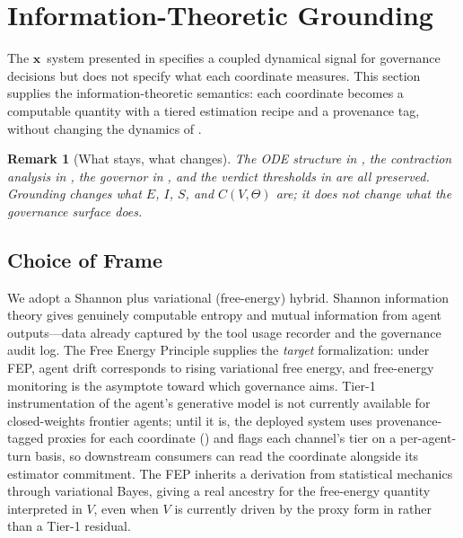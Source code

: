 \documentclass[11pt,twocolumn]{article}
\newtheorem{remark}[theorem]{Remark}
\newcommand{\eisv}{\ensuremath{\mathbf{x}}}
\newcommand{\cv}{\ensuremath{C(V,\Theta)}}
\begin{document}
\section{Information-Theoretic Grounding}
\label{sec:grounding}

The \eisv\ system presented in  specifies a
coupled dynamical signal for governance decisions but does not
specify what each coordinate measures. This section supplies the
information-theoretic semantics: each coordinate becomes a
computable quantity with a tiered estimation recipe and a
provenance tag, without changing the dynamics of
.

\begin{remark}[What stays, what changes]
The ODE structure in , the contraction
analysis in , the governor in
, and the verdict thresholds in  are
all preserved. Grounding changes what $E$, $I$, $S$, and
$\cv$ \emph{are}; it does not change what the governance surface
\emph{does}.
\end{remark}

\subsection{Choice of Frame}

We adopt a Shannon plus variational (free-energy) hybrid. Shannon
information theory gives genuinely computable entropy and mutual
information from agent outputs---data already captured by the tool
usage recorder and the governance audit log. The Free Energy Principle
\cite{friston2010free} supplies the \emph{target} formalization: under
FEP, agent drift corresponds to rising variational free energy, and
free-energy monitoring is the asymptote toward which governance aims.
Tier-1 instrumentation of the agent's generative model is not
currently available for closed-weights frontier agents; until it is,
the deployed system uses provenance-tagged proxies for each
coordinate () and flags each channel's
tier on a per-agent-turn basis, so downstream consumers can read the
coordinate alongside its estimator commitment. The FEP inherits a
derivation from statistical mechanics through variational Bayes,
giving a real ancestry for the free-energy quantity interpreted in
$V$, even when $V$ is currently driven by the proxy form in
 rather than a Tier-1 residual.
\end{document}

